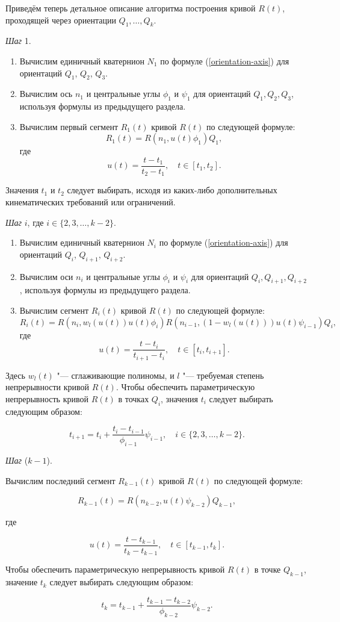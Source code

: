 Приведём теперь детальное описание алгоритма построения кривой $R(t)$, проходящей через ориентации $Q_1,\dots,Q_k$.

\bigskip
\textit{Шаг} 1.

\begin{enumerate}
\item Вычислим единичный кватернион $N_1$ по формуле (\ref{orientation-axis}) для ориентаций $Q_1$, $Q_2$, $Q_3$.
\item Вычислим ось $n_1$ и центральные углы $\phi_1$ и $\psi_1$ для ориентаций $Q_1,Q_2,Q_3$, используя формулы из
предыдущего раздела.
\item Вычислим первый сегмент $R_1(t)$ кривой $R(t)$ по следующей формуле:
$$
R_1(t)=R(n_1,u(t)\phi_1)Q_1,
$$
\noindent где
$$
u(t)=\frac{t-t_1}{t_2-t_1}, \quad t \in [t_1,t_2].
$$
\end{enumerate}

Значения $t_1$ и $t_2$ следует выбирать, исходя из каких-либо дополнительных кинематических требований или ограничений.

\bigskip
\textit{Шаг} $i$, где $i \in \{2,3,\dots,k-2\}$.

\begin{enumerate}
\item Вычислим единичный кватернион $N_i$ по формуле (\ref{orientation-axis}) для ориентаций $Q_i$, $Q_{i+1}$,
$Q_{i+2}$.
\item Вычислим оси $n_i$ и центральные углы $\phi_i$ и $\psi_i$ для ориентаций $Q_i, Q_{i+1}, Q_{i+2}$, используя
формулы из предыдущего раздела.
\item Вычислим сегмент $R_i(t)$ кривой $R(t)$ по следующей формуле:
$$
R_i(t)=R(n_i,w_l(u(t))u(t)\phi_i)R(n_{i-1},(1-w_l(u(t)))u(t)\psi_{i-1})Q_i,
$$
\noindent где
$$
u(t)=\frac{t-t_i}{t_{i+1}-t_i}, \quad t \in [t_i,t_{i+1}].
$$
\end{enumerate}

Здесь $w_l(t)$ "--- сглаживающие полиномы, и $l$ "--- требуемая степень непрерывности кривой $R(t)$. Чтобы обеспечить
параметрическую непрерывность кривой $R(t)$ в точках $Q_i$, значения $t_i$ следует выбирать следующим образом:

$$
t_{i+1}=t_i+\frac{t_i-t_{i-1}}{\phi_{i-1}}\psi_{i-1}, \quad i \in \{2,3,\dots,k-2\}.
$$

\bigskip
\textit{Шаг} ($k-1$).

Вычислим последний сегмент $R_{k-1}(t)$ кривой $R(t)$ по следующей формуле:

$$
R_{k-1}(t)=R(n_{k-2},u(t)\psi_{k-2})Q_{k-1},
$$

\noindent где

$$
u(t)=\frac{t-t_{k-1}}{t_k-t_{k-1}}, \quad t \in [t_{k-1},t_k].
$$

Чтобы обеспечить параметрическую непрерывность кривой $R(t)$ в точке $Q_{k-1}$, значение $t_k$ следует выбирать
следующим образом:

$$
t_k=t_{k-1}+\frac{t_{k-1}-t_{k-2}}{\phi_{k-2}}\psi_{k-2}.
$$
